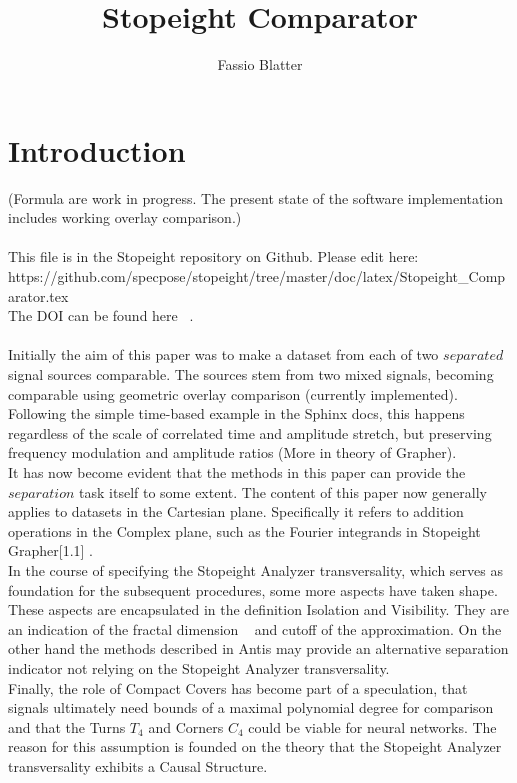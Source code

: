 \documentclass{report}
\begin{document}
\title{Stopeight Comparator}
\author{Fassio Blatter}
\maketitle

\chapter{Introduction}
(Formula are work in progress. The present state of the software implementation includes working overlay comparison.)\\\\
This file is in the Stopeight repository on Github. Please edit here:\\
https://github.com/specpose/stopeight/tree/master/doc/latex/Stopeight\_Comparator.tex\\
The DOI can be found here ~\cite{Analyzer}.\\\\
Initially the aim of this paper was to make a dataset from each of two $separated$ signal sources comparable. The sources stem from two mixed signals, becoming comparable using geometric overlay comparison (currently implemented). Following the simple time-based example in the Sphinx docs, this happens regardless of the scale of correlated time and amplitude stretch, but preserving frequency modulation and amplitude ratios (More in theory of Grapher).\\
It has now become evident that the methods in this paper can provide the $separation$ task itself to some extent. The content of this paper now generally applies to datasets in the Cartesian plane. Specifically it refers to addition operations in the Complex plane, such as the Fourier integrands in Stopeight Grapher\cite{Grapher}[1.1] .\\
In the course of specifying the Stopeight Analyzer transversality, which serves as foundation for the subsequent procedures, some more aspects have taken shape. These aspects are encapsulated in the definition Isolation and Visibility. They are an indication of the fractal dimension ~\cite{Widon} and cutoff of the approximation. On the other hand the methods described in Antis \cite{Antis} may provide an alternative separation indicator not relying on the Stopeight Analyzer transversality.\\
Finally, the role of Compact Covers has become part of a speculation, that signals ultimately need bounds of a maximal polynomial degree for comparison and that the Turns $T_{4}$ and Corners $C_{4}$ could be viable for neural networks. The reason for this assumption is founded on the theory that the Stopeight Analyzer transversality exhibits a Causal Structure.
\end{document}
